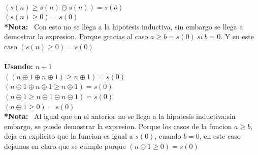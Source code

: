 \documentclass[10pt,a4paper]{article}
\begin{document}
\begin{itemize}
\begin{itemize}
\begin{itemize}
\begin{center}
\
\\$ (s(n)\geq s(n)\circleddash s(n)) = s(o) $
\
\\$ (s(n)\geq 0) = s(0) $
\
\\\textbf{*Nota: } \ Con esto no se llega a la hipotesis inductiva, sin embargo se llega a demostrar la expresion. Porque gracias al caso $ a\geq b = s(0) \ si \ b=0$. Y en este caso $ (s(n)\geq 0) = s(0) $
\
\\
\
\\\textbf{Usando:} $ n+1 $
\
\\ $((n\oplus 1\oplus n\oplus 1)\geq n\oplus 1) = s(0)$
\
\\ $ (n\oplus 1\oplus n\oplus 1\geq n\oplus 1) = s(0)$
\
\\ $ (n\oplus 1\geq n\oplus 1\circleddash n\circleddash 1) = s(0)$
\
\\ $ (n\oplus 1\geq 0) = s(0)$
\
\\\textbf{*Nota: }\ Al igual que en el anterior no se llega a la hipotesis inductiva;sin embargo, se puede demostrar la expresion. Porque los casos de la funcion $a\geq b$, deja en explicito que la funcion es igual a $s(0)$, cuando $ b=0$, en este caso dejamos en claro que se cumple porque $ (n\oplus 1\geq 0) = s(0) $
\end{center}
\end{itemize}
\end{itemize}
\end{itemize}
\begin{center}


\end{center}
\end{document}
